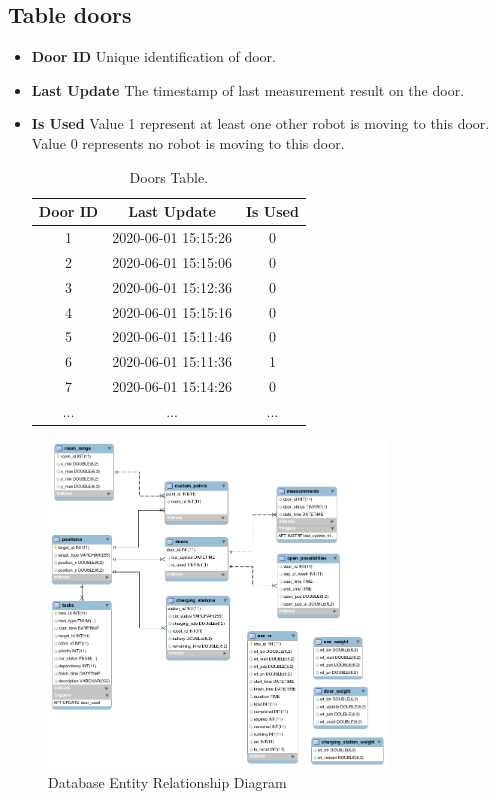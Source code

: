 \subsection*{Table doors}
\begin{itemize}
 \item \textbf{Door ID} Unique identification of door.
 \item \textbf{Last Update} The timestamp of last measurement result on the door.
 \item \textbf{Is Used} Value 1 represent at least one other robot is moving to this door. Value 0 represents no robot is moving to this door.
 \begin{table}
 \centering
 \begin{tabular}{|c|c|c|} 
 \hline
 Door ID & Last Update & Is Used \\ \hline
 1 & 2020-06-01 15:15:26 & 0 \\ \hline
 2 & 2020-06-01 15:15:06 & 0 \\ \hline
 3 & 2020-06-01 15:12:36 & 0 \\ \hline
 4 & 2020-06-01 15:15:16 & 0 \\ \hline
 5 & 2020-06-01 15:11:46 & 0 \\ \hline
 6 & 2020-06-01 15:11:36 & 1 \\ \hline
 7 & 2020-06-01 15:14:26 & 0 \\ \hline
 ...& ...& ... \\ \hline
 \end{tabular}
 \caption{Doors Table.}
 \label{tab:db_doors}
 \end{table}
\end{itemize}


\begin{figure}
 \centering
 \includegraphics[width = 0.8\textwidth]{content/images/ch4/database_er.png}
 \caption{Database Entity Relationship Diagram}
 \label{fig:database_er}
 \end{figure} 


